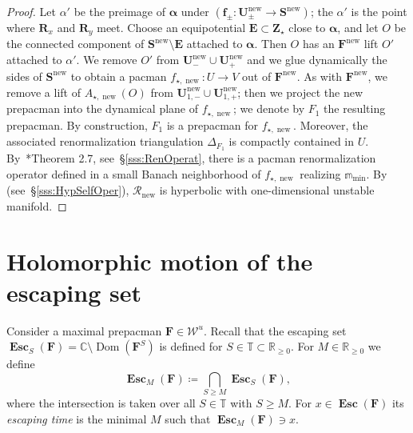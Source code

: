 \documentclass{amsart}
\newcommand{\Dom}{\operatorname {Dom}}
\newcommand{\1}{{\mathbb 1 }}
\newcommand\PT{\mathbb{ T}}
\newcommand{\bDelta}{{\mathbb{\Delta}}}
\newcommand\RR{\mathcal{R}}
\newcommand{\bF}{{\mathbf F}}
\newcommand{\bZ}{{\mathbf Z}}
\newcommand{\bR}{{\mathbf R}}
\newcommand{\bE}{{\mathbf E}}
\newcommand{\bS}{{\mathbf S}}
\newcommand{\bU}{{\mathbf U}}
\newcommand{\bbf}{{\mathbf f}}
\newcommand{\str}{{\star}}
\newcommand{\mm}{\mathbb{m}}
\newcommand\Unst{{\boldsymbol{\mathcal{W}}^u}}
\newcommand\new{{\operatorname{new}}}
\newcommand{\C}{\mathbb{C}}
\newcommand{\R}{\mathbb{R}}
\theoremstyle{remark}
\numberwithin{equation}{section}
\theoremstyle{definition}
\newcommand{\Esc}{{\boldsymbol{\operatorname{Esc}}}}
\newcommand{\balpha}{{\boldsymbol \alpha}}
\theoremstyle{nonumberbreak}
\begin{document}
\begin{proof}
Let $\alpha'$ be the preimage of $\balpha$ under $(\bbf_{\pm}\colon \bU^\new_{\pm }\to \bS^\new)$; the $\alpha'$ is the point where $\bR_x$ and $\bR_y$ meet. Choose an equipotential $\bE\subset \bZ_\str$ close to $\balpha$, and let $O$ be the connected component of $\bS^\new\setminus \bE$ attached to $\balpha$. Then $O$ has an $\bF^\new$ lift $O'$ attached to $\alpha'$. We remove $O'$ from $\bU^\new_{-}\cup \bU^\new_{+}$ and we glue dynamically the sides of $\bS^\new$ to obtain a pacman $f_{\str,\new}\colon U\to V$ out of $\bF^\new$. As with $\bF^\new$, we remove a lift of $A_{\str,\new}(O)$ from $\bU^\new_{1,- }\cup \bU^\new_{1, +}$; then we project the new prepacman into the dynamical plane of $f_{\str,\new}$; we denote by $F_1$ the resulting prepacman. By construction, $F_1$ is a prepacman for $f_{\str,\new}$. Moreover, the associated renormalization triangulation $\bDelta_{F_1}$ is compactly contained in $U$.  By~\cite{DLS}*{Theorem 2.7}, see~\S\ref{sss:RenOperat}, there is a pacman renormalization operator defined in a small Banach neighborhood of $f_{\str,\new}$ realizing $\mm_{\min}$. By \cite[Theorem 7.7]{DLS} (see~\S\ref{sss:HypSelfOper}), $\RR_\new$ is hyperbolic with one-dimensional unstable manifold.
\end{proof}


\section{Holomorphic motion of the escaping set}
\label{s:HolMot Esc}
Consider a maximal prepacman $\bF\in\Unst$. Recall that the escaping set $\Esc_S(\bF)=\C\setminus \Dom (\bF^S)$ is defined for $S\in \PT\subset \R_{\ge0}$. For $M\in \R_{\ge0}$ we define \[\displaystyle{\Esc_M(\bF)\coloneqq \bigcap_{S\ge M}\Esc_S(\bF)},\] where the intersection is taken over all $S\in \PT$ with $S\ge M$.  For $x\in \Esc(\bF)$ its \emph{escaping time} is the minimal $M$ such that $\Esc_M(\bF)\ni x$.
\end{document}
